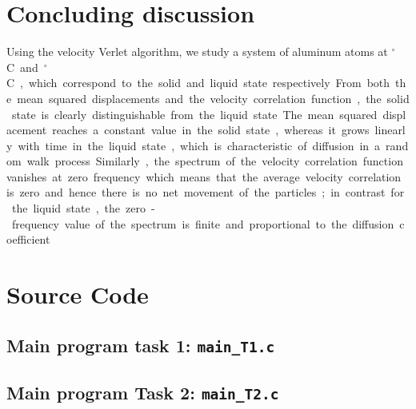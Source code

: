 \section*{Concluding discussion}
Using the velocity Verlet algorithm, we study a system of aluminum atoms  at \unit[500]{$^\circ$ C} and \unit[700]{$^\circ$ C}, which correspond to the solid and liquid state respectively.

From both the mean squared displacements and the velocity correlation function, the solid state is 
clearly distinguishable from the liquid state. The mean squared displacement reaches a constant value in the solid state, whereas it grows linearly with time in the liquid state, which is characteristic of diffusion in a random walk process. Similarly, the spectrum of the velocity correlation function vanishes at zero frequency which means that the average velocity correlation is zero and hence there is no net movement of the particles; in contrast for the liquid state, the zero-frequency value of the spectrum is finite and proportional to the diffusion coefficient. 
\newpage

\appendix

\section{Source Code}

%

%

\subsection{Main program task 1: \texttt{main\_T1.c}}


\subsection{Main program  Task 2: \texttt{main\_T2.c}}


